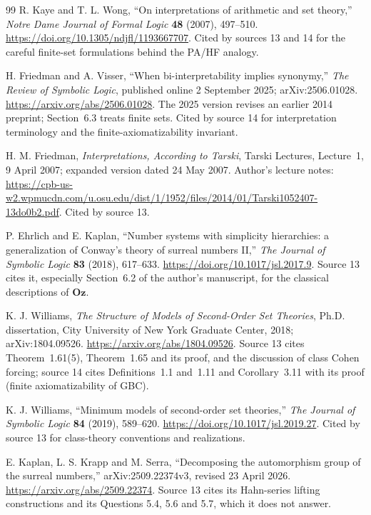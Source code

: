 \documentclass[11pt,letterpaper]{article}
\theoremstyle{definition}
\theoremstyle{remark}
\newcommand{\Oz}{\mathbf{Oz}}
\begin{document}
\begin{thebibliography}{99}
R. Kaye and T. L. Wong, ``On interpretations of arithmetic and set theory,''
\emph{Notre Dame Journal of Formal Logic} \textbf{48} (2007), 497--510.
\url{https://doi.org/10.1305/ndjfl/1193667707}. Cited by sources 13 and 14 for the
careful finite-set formulations behind the PA/HF analogy.

H. Friedman and A. Visser, ``When bi-interpretability implies synonymy,''
\emph{The Review of Symbolic Logic}, published online 2 September 2025;
arXiv:2506.01028. \url{https://arxiv.org/abs/2506.01028}. The 2025 version revises
an earlier 2014 preprint; Section~6.3 treats finite sets. Cited by source 14 for
interpretation terminology and the finite-axiomatizability invariant.

H. M. Friedman, \emph{Interpretations, According to Tarski}, Tarski Lectures,
Lecture~1, 9 April 2007; expanded version dated 24 May 2007. Author's lecture notes:
\url{https://cpb-us-w2.wpmucdn.com/u.osu.edu/dist/1/1952/files/2014/01/Tarski1052407-13do0b2.pdf}.
Cited by source 13.

P. Ehrlich and E. Kaplan, ``Number systems with simplicity hierarchies: a
generalization of Conway's theory of surreal numbers II,'' \emph{The Journal of
Symbolic Logic} \textbf{83} (2018), 617--633.
\url{https://doi.org/10.1017/jsl.2017.9}. Source 13 cites it, especially Section~6.2
of the author's manuscript, for the classical descriptions of $\Oz$.

K. J. Williams, \emph{The Structure of Models of Second-Order Set Theories}, Ph.D.
dissertation, City University of New York Graduate Center, 2018; arXiv:1804.09526.
\url{https://arxiv.org/abs/1804.09526}. Source 13 cites Theorem~1.61(5), Theorem~1.65
and its proof, and the discussion of class Cohen forcing; source 14 cites
Definitions~1.1 and~1.11 and Corollary~3.11 with its proof (finite axiomatizability
of GBC).

K. J. Williams, ``Minimum models of second-order set theories,'' \emph{The Journal of
Symbolic Logic} \textbf{84} (2019), 589--620.
\url{https://doi.org/10.1017/jsl.2019.27}. Cited by source 13 for class-theory
conventions and realizations.

E. Kaplan, L. S. Krapp and M. Serra, ``Decomposing the automorphism group of the
surreal numbers,'' arXiv:2509.22374v3, revised 23 April 2026.
\url{https://arxiv.org/abs/2509.22374}. Source 13 cites its Hahn-series lifting
constructions and its Questions 5.4, 5.6 and 5.7, which it does not answer.


\end{thebibliography}
\end{document}
